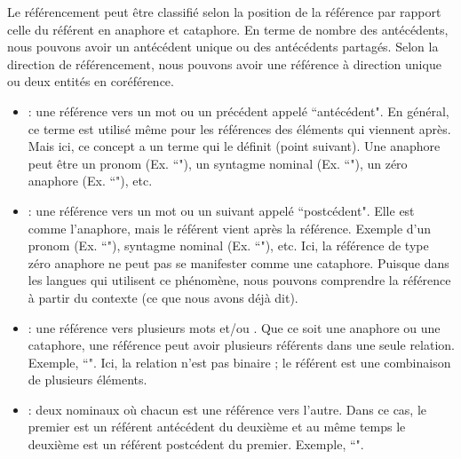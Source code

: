 \documentclass{KodeBook}
\begin{document}
Le référencement peut être classifié selon la position de la référence par rapport celle du référent en anaphore et cataphore. 
En terme de nombre des antécédents, nous pouvons avoir un antécédent unique ou des antécédents partagés. 
Selon la direction de référencement, nous pouvons avoir une référence à direction unique ou deux entités en coréférence.

\begin{itemize}
	\item {} : une référence vers un mot ou un  précédent appelé ``antécédent".
	En général, ce terme est utilisé même pour les références des éléments qui viennent après. 
	Mais ici, ce concept a un terme qui le définit (point suivant).
	Une anaphore peut être un pronom (Ex. ``"), un syntagme nominal (Ex. ``"), un zéro anaphore (Ex. ``"), etc.
	
	\item {} : une référence vers un mot ou un  suivant appelé ``postcédent".
	Elle est comme l'anaphore, mais le référent vient après la référence. 
	Exemple d'un pronom (Ex. ``"), syntagme nominal (Ex. ``"), etc. 
	Ici, la référence de type zéro anaphore ne peut pas se manifester comme une cataphore. 
	Puisque dans les langues qui utilisent ce phénomène, nous pouvons comprendre la référence à partir du contexte (ce que nous avons déjà dit).
	
	\item {} : une référence vers plusieurs mots et/ou .
	Que ce soit une anaphore ou une cataphore, une référence peut avoir plusieurs référents dans une seule relation.
	Exemple, ``".
	Ici, la relation n'est pas binaire ; le référent est une combinaison de plusieurs éléments. 
	
	\item {} : deux  nominaux où chacun est une référence vers l'autre. 
	Dans ce cas, le premier est un référent antécédent du deuxième et au même temps le deuxième est un référent postcédent du premier.  
	Exemple, ``".
	
\end{itemize}
\end{document}
